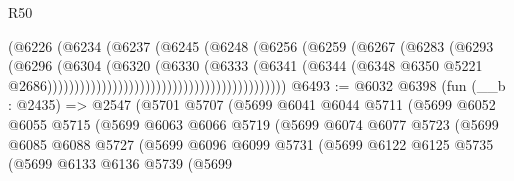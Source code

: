 \begin{lexlean}{R50}
\begin{coremodule}
                                                        (@6226
                                                          (@6234
                                                            (@6237
                                                              (@6245
                                                                (@6248
                                                                  (@6256
                                                                    (@6259
                                                                      (@6267
                                                                        (@6283
                                                                          (@6293
                                                                            (@6296
                                                                              (@6304
                                                                                (@6320
                                                                                  (@6330
                                                                                    (@6333
                                                                                      (@6341
                                                                                        (@6344
                                                                                          (@6348
                                                                                            @6350
                                                                                            @5221
                                                                                            @2686))))))))))))))))))))))))))))))))))))))))))))
@6493 := @6032
    @6398
    (fun (__b : @2435) =>
    @2547
      (@5701
        @5707
        (@5699
          @6041
          @6044
          @5711
          (@5699
            @6052
            @6055
            @5715
            (@5699
              @6063
              @6066
              @5719
              (@5699
                @6074
                @6077
                @5723
                (@5699
                  @6085
                  @6088
                  @5727
                  (@5699
                    @6096
                    @6099
                    @5731
                    (@5699
                      @6122
                      @6125
                      @5735
                      (@5699
                        @6133
                        @6136
                        @5739
                        (@5699

\end{coremodule}
\end{lexlean}
